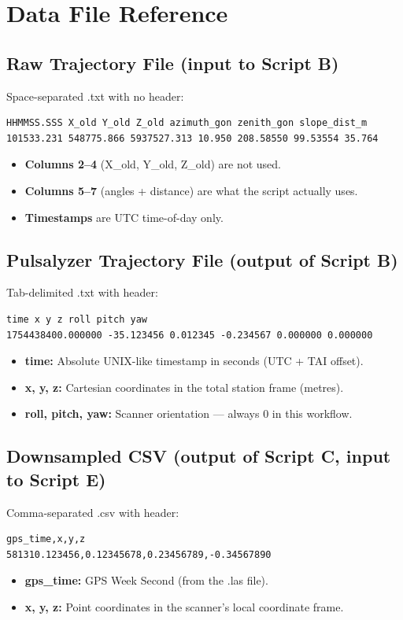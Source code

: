 \chapter{Data File Reference}

\section{Raw Trajectory File (input to Script B)}
Space-separated .txt with no header:
\begin{lstlisting}
HHMMSS.SSS X_old Y_old Z_old azimuth_gon zenith_gon slope_dist_m
101533.231 548775.866 5937527.313 10.950 208.58550 99.53554 35.764
\end{lstlisting}
\begin{itemize}
    \item \textbf{Columns 2--4} (X\_old, Y\_old, Z\_old) are not used.
    \item \textbf{Columns 5--7} (angles + distance) are what the script actually uses.
    \item \textbf{Timestamps} are UTC time-of-day only.
\end{itemize}

\section{Pulsalyzer Trajectory File (output of Script B)}
Tab-delimited .txt with header:
\begin{lstlisting}
time x y z roll pitch yaw
1754438400.000000 -35.123456 0.012345 -0.234567 0.000000 0.000000
\end{lstlisting}
\begin{itemize}
    \item \textbf{time:} Absolute UNIX-like timestamp in seconds (UTC + TAI offset).
    \item \textbf{x, y, z:} Cartesian coordinates in the total station frame (metres).
    \item \textbf{roll, pitch, yaw:} Scanner orientation --- always 0 in this workflow.
\end{itemize}

\section{Downsampled CSV (output of Script C, input to Script E)}
Comma-separated .csv with header:
\begin{lstlisting}
gps_time,x,y,z
581310.123456,0.12345678,0.23456789,-0.34567890
\end{lstlisting}
\begin{itemize}
    \item \textbf{gps\_time:} GPS Week Second (from the .las file).
    \item \textbf{x, y, z:} Point coordinates in the scanner's local coordinate frame.
\end{itemize}
